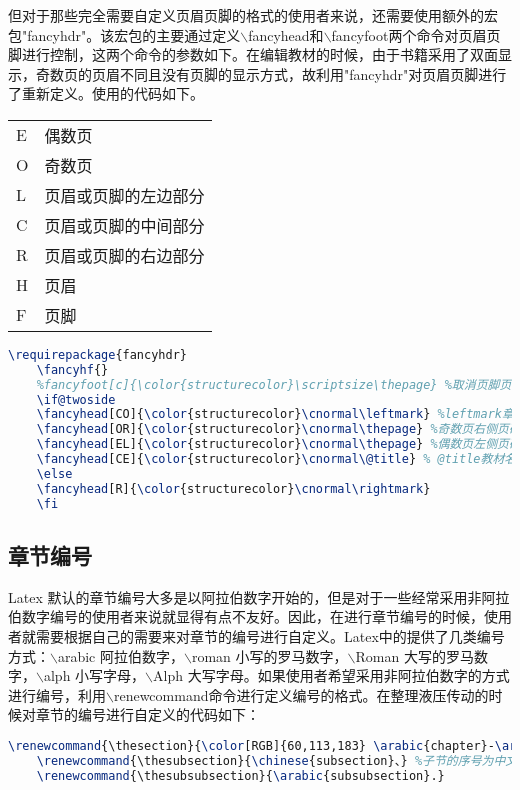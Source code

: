 \documentclass[cn,10pt,math=newtx,citestyle=gb7714-2015,bibstyle=gb7714-2015]{elegantbook}
\begin{document}
但对于那些完全需要自定义页眉页脚的格式的使用者来说，还需要使用额外的宏包"fancyhdr"。该宏包的主要通过定义$\backslash$fancyhead和$\backslash$fancyfoot两个命令对页眉页脚进行控制，这两个命令的参数如下。在编辑教材的时候，由于书籍采用了双面显示，奇数页的页眉不同且没有页脚的显示方式，故利用"fancyhdr"对页眉页脚进行了重新定义。使用的代码如下。
\begin{table}[h]
	\centering
	\begin{tabular}{ll}
		E &	偶数页\\
		O &	奇数页 \\
		L &	页眉或页脚的左边部分\\
		C &	页眉或页脚的中间部分\\
		R &	页眉或页脚的右边部分\\
		H &	页眉\\
		F &	页脚
	\end{tabular}
\end{table}
\begin{lstlisting}[language=tex]
	\requirepackage{fancyhdr}
	\fancyhf{} 
	%fancyfoot[c]{\color{structurecolor}\scriptsize\thepage} %取消页脚页码
	\if@twoside
	\fancyhead[CO]{\color{structurecolor}\cnormal\leftmark} %leftmark章节名称，奇数页页眉中部显示章节名称
	\fancyhead[OR]{\color{structurecolor}\cnormal\thepage} %奇数页右侧页码
	\fancyhead[EL]{\color{structurecolor}\cnormal\thepage} %偶数页左侧页码
	\fancyhead[CE]{\color{structurecolor}\cnormal\@title} % @title教材名称，偶数页页眉中部显示教材名称
	\else
	\fancyhead[R]{\color{structurecolor}\cnormal\rightmark}
	\fi
\end{lstlisting}

\subsection{章节编号}

Latex 默认的章节编号大多是以阿拉伯数字开始的，但是对于一些经常采用非阿拉伯数字编号的使用者来说就显得有点不友好。因此，在进行章节编号的时候，使用者就需要根据自己的需要来对章节的编号进行自定义。Latex中的提供了几类编号方式：$\backslash$arabic 阿拉伯数字，$\backslash$roman 小写的罗马数字，$\backslash$Roman 大写的罗马数字，$\backslash$alph 小写字母，$\backslash$Alph 大写字母。如果使用者希望采用非阿拉伯数字的方式进行编号，利用$\backslash$renewcommand命令进行定义编号的格式。在整理液压传动的时候对章节的编号进行自定义的代码如下：

\begin{lstlisting}[language=tex]
	\renewcommand{\thesection}{\color[RGB]{60,113,183} \arabic{chapter}-\arabic{section}} %设置section的格式为章序号-节序号
	\renewcommand{\thesubsection}{\chinese{subsection}、} %子节的序号为中文序号+顿号
	\renewcommand{\thesubsubsection}{\arabic{subsubsection}.} 
\end{lstlisting}
\end{document}
